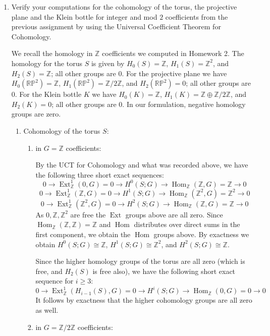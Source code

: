 \documentclass[11pt]{article}
\DeclareMathOperator{\Hom}{Hom}
\DeclareMathOperator{\Ext}{Ext}
\begin{document}
\begin{enumerate}
    \item Verify your computations for the cohomology of the torus, the projective plane and the Klein bottle for integer and mod $2$ coefficients from the previous assignment by using the Universal Coefficient Theorem for Cohomology.
    
    We recall the homology in $\mathbb{Z}$ coefficients we computed in Homework 2. The homology for the torus $S$ is given by $H_0(S) = \mathbb{Z}$, $H_1(S) = \mathbb{Z}^{2}$, and $H_2(S) = \mathbb{Z}$; all other groups are $0$. For the projective plane we have $H_0(\mathbb{RP}^2) = \mathbb{Z}$, $H_1(\mathbb{RP}^2)=\mathbb{Z}/2\mathbb{Z}$, and $H_2(\mathbb{RP}^2)=0$; all other groups are $0$. For the Klein bottle $K$ we have $H_0(K) = \mathbb{Z}$, $H_1(K) = \mathbb{Z}\oplus\mathbb{Z}/2\mathbb{Z}$, and $H_2(K) = 0$; all other groups are $0$. In our formulation, negative homology groups are zero.
    \begin{enumerate}
      \item Cohomology of the torus $S$:\begin{enumerate}
        \item in $G=\mathbb{Z}$ coefficients:
        
        By the UCT for Cohomology and what was recorded above, we have the following three short exact sequences:
        \[0\to \Ext_\mathbb{Z}^1(0, G)=0\to H^0(S;G)\to \Hom_\mathbb{Z}(\mathbb{Z},G)=\mathbb{Z}\to 0\]
        \[0\to \Ext_\mathbb{Z}^1(\mathbb{Z}, G)=0\to H^1(S;G)\to \Hom_\mathbb{Z}(\mathbb{Z}^2,G)=\mathbb{Z}^2\to 0\]
        \[0\to \Ext_\mathbb{Z}^1(\mathbb{Z}^2, G)=0\to H^2(S;G)\to \Hom_\mathbb{Z}(\mathbb{Z},G)=\mathbb{Z}\to 0\] 
        As $0,\mathbb{Z},\mathbb{Z}^2$ are free the $\Ext$ groups above are all zero. Since $\Hom_\mathbb{Z}(\mathbb{Z},\mathbb{Z}) = \mathbb{Z}$ and $\Hom$ distributes over direct sums in the first component, we obtain the $\Hom$ groups above. By exactness we obtain $H^0(S;G)\cong\mathbb{Z}$, $H^1(S;G)\cong\mathbb{Z}^2$, and $H^2(S;G)\cong\mathbb{Z}$.

        Since the higher homology groups of the torus are all zero (which is free, and $H_2(S)$ is free also), we have the following short exact sequence for $i\geq 3$: \[0\to \Ext_\mathbb{Z}^1(H_{i-1}(S), G)=0\to H^i(S;G)\to \Hom_\mathbb{Z}(0,G)=0\to 0\] It follows by exactness that the higher cohomology groups are all zero as well.
        \item in $G=\mathbb{Z}/2\mathbb{Z}$ coefficients:
        

\end{enumerate}
\end{enumerate}
\end{enumerate}
\end{document}
